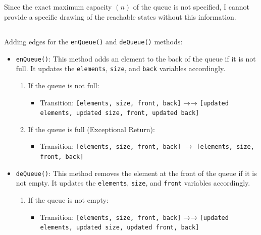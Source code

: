 \documentclass{article}
\begin{document}
\begin{latin}
\subsection{}
Since the exact maximum capacity $(n)$ of the queue is not specified, I cannot provide a specific drawing of the reachable states without this information.

\subsection{}
Adding edges for the \texttt{enQueue()} and \texttt{deQueue()} methods:

\begin{itemize}
\item \texttt{enQueue()}: This method adds an element to the back of the queue if it is not full. It updates the \texttt{elements}, \texttt{size}, and \texttt{back} variables accordingly.

\begin{enumerate}
\item If the queue is not full:
\begin{itemize}
\item Transition: \texttt{[elements, size, front, back]} →→ \texttt{[updated elements, updated size, front, updated back]}
\end{itemize}

\item If the queue is full (Exceptional Return):
\begin{itemize}
  \item Transition: \texttt{[elements, size, front, back]} $\rightarrow$ \texttt{[elements, size, front, back]}
\end{itemize}

\end{enumerate}

\item \texttt{deQueue()}: This method removes the element at the front of the queue if it is not empty. It updates the \texttt{elements}, \texttt{size}, and \texttt{front} variables accordingly.

\begin{enumerate}
\item If the queue is not empty:
\begin{itemize}
\item Transition: \texttt{[elements, size, front, back]} →→ \texttt{[updated elements, updated size, updated front, back]}
\end{itemize}


\end{enumerate}
\end{itemize}
\end{latin}
\end{document}
